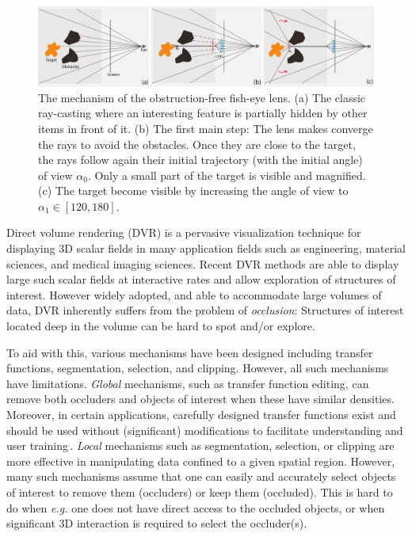 \begin{figure} 
\includegraphics [width=\textwidth]{images/principle.pdf} 
\caption{The mechanism of the obstruction-free fish-eye lens. (a) The classic ray-casting where an interesting feature is partially hidden by other items in front of it. (b) The first main step: The lens makes converge the rays to avoid the obstacles. Once they are close to the target, the rays follow again their initial trajectory (with the initial angle) of view $\alpha_0$. Only a small part of the target is visible and magnified. (c) The target become visible by increasing the angle of view to $\alpha_1 \in \left[120,180\right]$.   }
\label{f:fisheye}
\end{figure}


Direct volume rendering (DVR) is a pervasive visualization technique for displaying 3D scalar fields in many application fields such as engineering, material sciences, and medical imaging sciences. Recent DVR methods are able to display large such scalar fields at interactive rates and allow exploration of structures of interest. However widely adopted, and able to accommodate large volumes of data, DVR inherently suffers from the problem of \emph{occlusion}: Structures of interest located deep in the volume can be hard to spot and/or explore.

To aid with this, various mechanisms have been designed including transfer functions, segmentation, selection, and clipping. However, all such mechanisms have limitations.  \emph{Global} mechanisms, such as transfer function editing, can remove both occluders and objects of interest when these have similar densities. Moreover, in certain applications, carefully designed transfer functions exist and should be used without (significant) modifications to facilitate understanding and user training\,\cite{xxx}. \emph{Local} mechanisms such as segmentation, selection, or clipping are more effective in manipulating data confined to a given spatial region. However, many such mechanisms assume that one can easily and accurately select objects of interest to remove them (occluders) or keep them (occluded). This is hard to do when \emph{e.g.} one does not have direct access to the occluded objects, or when significant 3D interaction is required to select the occluder(s).

